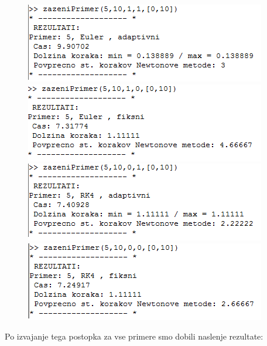 \documentclass[12pt]{article}
\begin{document}
    \begin{figure}[H]
        \centering
        \begin{minipage}{.5\textwidth}
            \centering
            \includegraphics[scale=1]{a1}
            \includegraphics[scale=1]{a2}
            \includegraphics[scale=1]{a3}
	        \includegraphics[scale=1]{a4}
        \end{minipage}%
    \end{figure}	
\newpage
Po izvajanje tega postopka za vse primere smo dobili naslenje rezultate: \\
\end{document}
